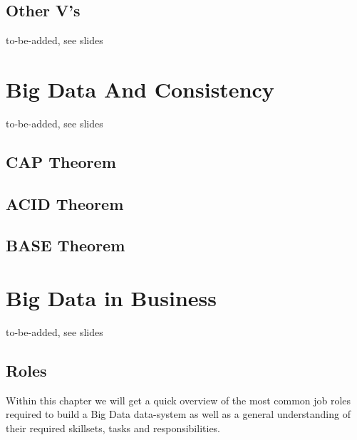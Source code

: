 \subsection{Other V's}
\label{bd_vs_other_vs}
to-be-added, see slides

\section{Big Data And Consistency}
\label{bd_consistency}
to-be-added, see slides

\subsection{CAP Theorem}
\label{bd_consistency_cap}

\subsection{ACID Theorem}
\label{bd_consistency_acid}

\subsection{BASE Theorem}
\label{bd_consistency_base}

\section{Big Data in Business}
\label{bd_bdib}
to-be-added, see slides

\subsection{Roles}
\label{bd_bdib_roles}
Within this chapter we will get a quick overview of the most common job roles required to build a Big Data data-system as well as a general understanding of their required skillsets, tasks and responsibilities.


